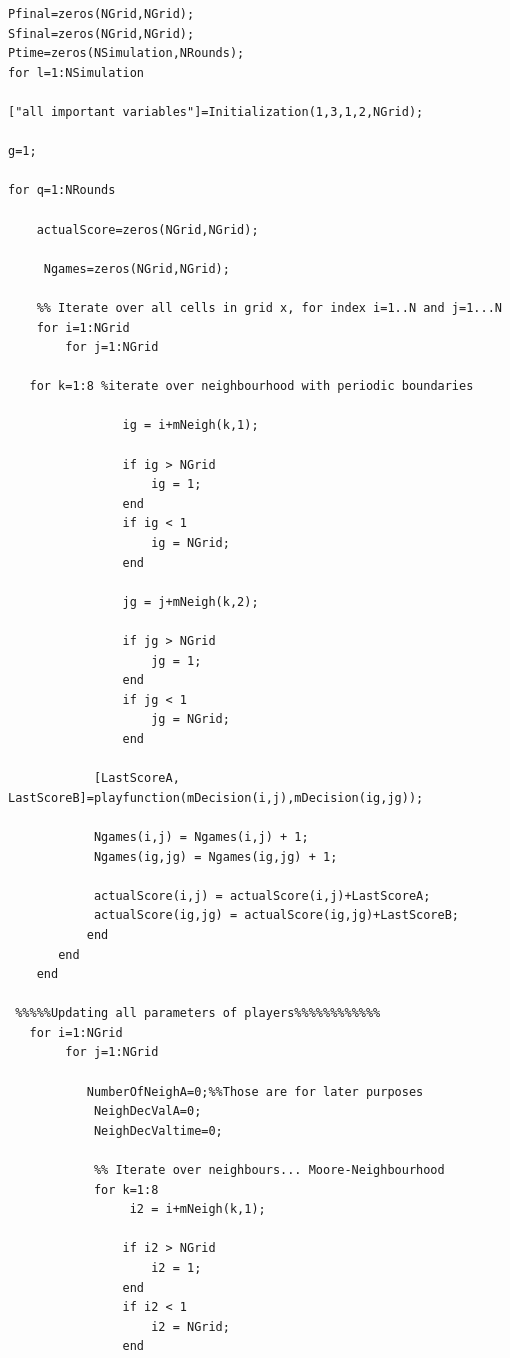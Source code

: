 \documentclass[11pt]{article}
\begin{document}
\begin{verbatim}
Pfinal=zeros(NGrid,NGrid);
Sfinal=zeros(NGrid,NGrid); 
Ptime=zeros(NSimulation,NRounds); 
for l=1:NSimulation

["all important variables"]=Initialization(1,3,1,2,NGrid);

g=1;
    
for q=1:NRounds

    actualScore=zeros(NGrid,NGrid); 
    
     Ngames=zeros(NGrid,NGrid);
          
    %% Iterate over all cells in grid x, for index i=1..N and j=1...N
    for i=1:NGrid
        for j=1:NGrid
        
   for k=1:8 %iterate over neighbourhood with periodic boundaries
              
                ig = i+mNeigh(k,1);
                
                if ig > NGrid
                    ig = 1;
                end
                if ig < 1
                    ig = NGrid;
                end
                
                jg = j+mNeigh(k,2);
                
                if jg > NGrid
                    jg = 1;
                end
                if jg < 1
                    jg = NGrid;
                end
                
            [LastScoreA, LastScoreB]=playfunction(mDecision(i,j),mDecision(ig,jg));
  
            Ngames(i,j) = Ngames(i,j) + 1;
            Ngames(ig,jg) = Ngames(ig,jg) + 1;
            
            actualScore(i,j) = actualScore(i,j)+LastScoreA;
            actualScore(ig,jg) = actualScore(ig,jg)+LastScoreB;
           end
       end
    end
            
 %%%%%Updating all parameters of players%%%%%%%%%%%%
   for i=1:NGrid
        for j=1:NGrid

           NumberOfNeighA=0;%%Those are for later purposes
            NeighDecValA=0;
            NeighDecValtime=0;
            
            %% Iterate over neighbours... Moore-Neighbourhood
            for k=1:8
                 i2 = i+mNeigh(k,1);
                
                if i2 > NGrid
                    i2 = 1;
                end
                if i2 < 1
                    i2 = NGrid;
                end
                

\end{verbatim}
\end{document}
